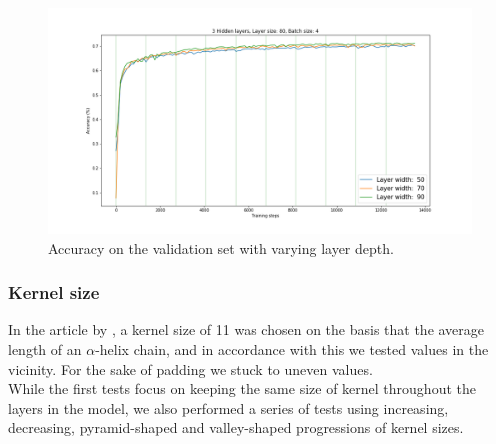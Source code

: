 \begin{figure}[H]
  \centering
  \includegraphics[width=\linewidth]{../graphs/new/layer_width_1}
  \caption{Accuracy on the validation set with varying layer depth.}
\end{figure}
\subsubsection{Kernel size}
In the article by \citeauthor{wang-et-al-2016}, a kernel size of 11 was chosen on the basis that the average length of an $\alpha$-helix chain, and in accordance with this we tested values in the vicinity\citep[p. 3]{wang-et-al-2016}. For the sake of padding we stuck to uneven values.\\
While the first tests focus on keeping the same size of kernel throughout the layers in the model, we also performed a series of tests using increasing, decreasing, pyramid-shaped and valley-shaped progressions of kernel sizes.

